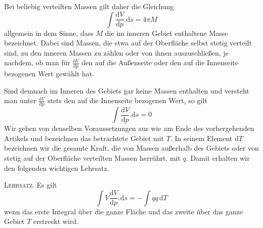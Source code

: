 Bei beliebig verteilten Massen gilt daher die Gleichung
\[
\int\frac{\mathrm dV}{\mathrm dp}.\mathrm ds=4\pi M
\]
allgemein in dem Sinne, dass $M$ die im inneren Gebiet enthaltene Masse bezeichnet. Dabei sind Massen, die etwa auf der Oberfläche selbst stetig verteilt sind, zu den inneren Massen zu zählen oder von ihnen auszuschließen, je nachdem, ob man für $\frac{\mathrm dV}{\mathrm dp}$ den auf die Außenseite oder den auf die Innenseite bezogenen Wert gewählt hat.

Sind demnach im Inneren des Gebiets gar keine Massen enthalten und versteht man unter $\frac{\mathrm dV}{\mathrm dp}$ stets den auf die Innenseite bezogenen Wert, so gilt
\[
\int\frac{\mathrm dV}{\mathrm dp}.\mathrm ds=0
\]
Wir gehen von denselben Voraussetzungen aus wie am Ende des vorhergehenden Artikels und bezeichnen das betrachtete Gebiet mit $T$. In seinem Element $\mathrm dT$ bezeichnen wir die gesamte Kraft, die von Massen außerhalb des Gebiets oder von stetig auf der Oberfläche verteilten Massen herrührt, mit $q$. Damit erhalten wir den folgenden wichtigen Lehrsatz.

\textsc{Lehrsatz.} Es gilt
\[
\int V\frac{\mathrm dV}{\mathrm dp}.\mathrm ds=-\int qq\,\mathrm dT
\]
wenn das erste Integral über die ganze Fläche und das zweite über das ganze Gebiet $T$ erstreckt wird.

